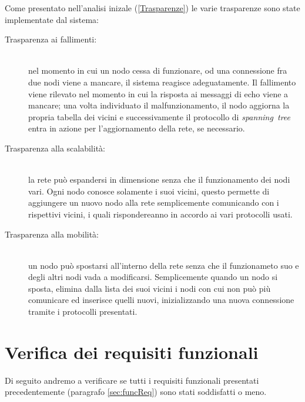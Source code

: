 \documentclass[italian]{memoir}
\begin{document}
Come presentato nell'analisi inizale (\ref{Trasparenze}) le varie trasparenze sono state implementate dal sistema:
\begin{description} 
\item[Trasparenza ai fallimenti:]~\\ nel momento in cui un nodo cessa di funzionare, od una connessione fra due nodi viene a mancare, il sistema reagisce adeguatamente. Il fallimento viene rilevato nel momento in cui la risposta ai messaggi di echo viene a mancare; una volta individuato il malfunzionamento, il nodo aggiorna la propria tabella dei vicini e successivamente il protocollo di \textit{spanning~tree} entra in azione per l'aggiornamento della rete, se necessario.
\item[Trasparenza alla scalabilità:]~\\ la rete può espandersi in dimensione senza che il funzionamento dei nodi vari. Ogni nodo conosce solamente i suoi vicini, questo permette di aggiungere un nuovo nodo alla rete semplicemente comunicando con i rispettivi vicini, i quali rispondereanno in accordo ai vari protocolli usati.
\item[Trasparenza alla mobilità:]~\\ un nodo può spostarsi all'interno della rete senza che il funzionameto suo e degli altri nodi vada a modificarsi. Semplicemente quando un nodo si sposta, elimina dalla lista dei suoi vicini i nodi con cui non può più comunicare ed inserisce quelli nuovi, inizializzando una nuova connessione tramite i protocolli presentati.
\end{description}

\section{Verifica dei requisiti funzionali}

Di seguito andremo a verificare se tutti i requisiti funzionali presentati precedentemente (paragrafo \ref{sec:funcReq}) sono stati soddisfatti o meno.
\end{document}
